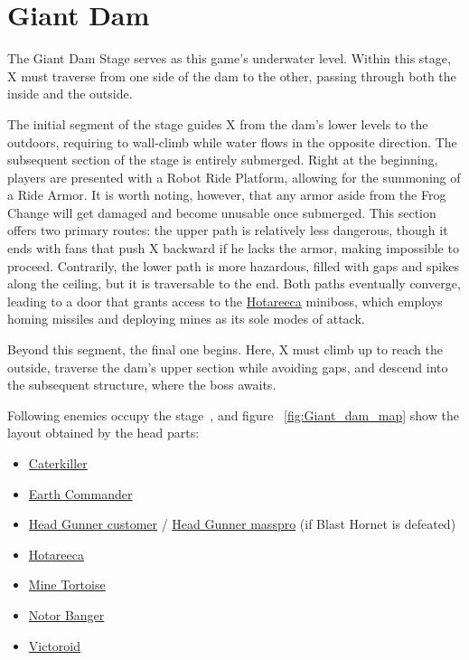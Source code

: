 \section{Giant Dam}
The Giant Dam Stage serves as this game's underwater level. Within this stage, X must traverse from one side of the dam to the other, passing through both the inside and the outside.

The initial segment of the stage guides X from the dam's lower levels to the outdoors, requiring to wall-climb while water flows in the opposite direction.
The subsequent section of the stage is entirely submerged. Right at the beginning, players are presented with a Robot Ride Platform, allowing for the summoning of a Ride Armor. It is worth noting, however, that any armor aside from the Frog Change will get damaged and become unusable once submerged. This section offers two primary routes: the upper path is relatively less dangerous, though it ends with fans that push X backward if he lacks the armor, making impossible to proceed. Contrarily, the lower path is more hazardous, filled with gaps and spikes along the ceiling, but it is traversable to the end. Both paths eventually converge, leading to a door that grants access to the \hyperlink{miniboss:Hotareeca}{Hotareeca} miniboss, which employs homing missiles and deploying mines as its sole modes of attack.

Beyond this segment, the final one begins. Here, X must climb up to reach the outside, traverse the dam's upper section while avoiding gaps, and descend into the subsequent structure, where the boss awaits.

Following enemies occupy the stage~\cite{wiki:Giant_Dam}, and figure ~\ref{fig:Giant_dam_map} show the layout obtained by the head parts:
\begin{itemize}
\item \hyperlink{enem:Caterkiller}{Caterkiller}
\item \hyperlink{enem:Earth_Commander}{Earth Commander}
\item \hyperlink{enem:Head_Gunner_customer}{Head Gunner customer} / \hyperlink{enem:Head_Gunner_masspro}{Head Gunner masspro} (if Blast Hornet is defeated) 
\item \hyperlink{miniboss:Hotareeca}{Hotareeca}
\item \hyperlink{enem:Mine_Tortoise}{Mine Tortoise}
\item \hyperlink{enem:Notor_Banger}{Notor Banger}
\item \hyperlink{enem:Victoroid}{Victoroid}
\end{itemize}


